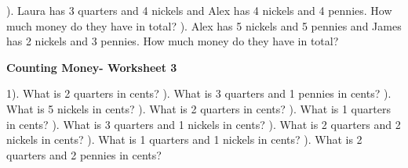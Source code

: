 \documentclass{article}%
\begin{document}
). Laura has 3 quarters and 4 nickels and Alex has 4 nickels and 4 pennies. How much money do they have in total?%
\newline%
\newline%
). Alex has 5 nickels and 5 pennies and James has 2 nickels and 3 pennies. How much money do they have in total?%
\newline%
\newline%
\newline%
\pagebreak%
\large%
\begin{center}%
\textbf{Counting Money- Worksheet 3}%
\newline%
\newline%
\newline%
\end{center} \normalsize%
1). What is 2 quarters in cents?%
\newline%
\newline%
). What is 3 quarters and 1 pennies in cents?%
\newline%
\newline%
). What is 5 nickels in cents?%
\newline%
\newline%
). What is 2 quarters in cents?%
\newline%
\newline%
). What is 1 quarters in cents?%
\newline%
\newline%
). What is 3 quarters and 1 nickels in cents?%
\newline%
\newline%
). What is 2 quarters and 2 nickels in cents?%
\newline%
\newline%
). What is 1 quarters and 1 nickels in cents?%
\newline%
\newline%
). What is 2 quarters and 2 pennies in cents?%
\newline%
\newline%
\newline%
\end{document}
